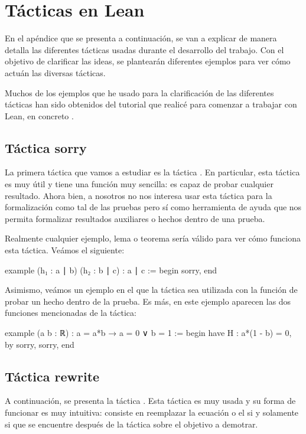 \chapter{Tácticas en Lean}\label{apentacti}

En el apéndice que se presenta a continuación, se van a explicar de manera
detalla las diferentes tácticas usadas durante el desarrollo del trabajo.
Con el objetivo de clarificar las ideas, se plantearán diferentes ejemplos
para ver cómo actuán las diversas tácticas.

Muchos de los ejemplos que he usado para la clarificación de las diferentes
tácticas han sido obtenidos del tutorial que realicé para comenzar a trabajar
con Lean, en concreto \cite{tutor}.

\section{Táctica sorry}

La primera táctica que vamos a estudiar es la táctica .
En particular, esta táctica es muy útil y tiene una función muy sencilla:
es capaz de probar cualquier resultado. Ahora bien, a nosotros no nos interesa
usar esta táctica para la formalización como tal de las pruebas pero sí como
herramienta de ayuda que nos permita formalizar resultados auxiliares o
hechos dentro de una prueba.

Realmente cualquier ejemplo, lema o teorema sería válido para ver cómo funciona
esta táctica. Veámos el siguiente:
\begin{leancode}
example (h₁ : a ∣ b) (h₂ : b ∣ c) : a ∣ c :=
begin
  sorry,
end
\end{leancode}

Asimismo, veámos un ejemplo en el que la táctica  sea
utilizada con la función de probar un hecho dentro de la prueba. Es más,
en este ejemplo aparecen las dos funciones mencionadas de la táctica:
\begin{leancode}
example (a b : ℝ) : a = a*b → a = 0 ∨ b = 1 :=
begin
  have H : a*(1 - b) = 0, by sorry,
  sorry,
end
\end{leancode}

\section{Táctica rewrite}

A continuación, se presenta la táctica . Esta táctica
es muy usada y su forma de funcionar es muy intuitiva: consiste en reemplazar
la ecuación o el si y solamente si que se encuentre después de la táctica
 sobre el objetivo a demotrar.

